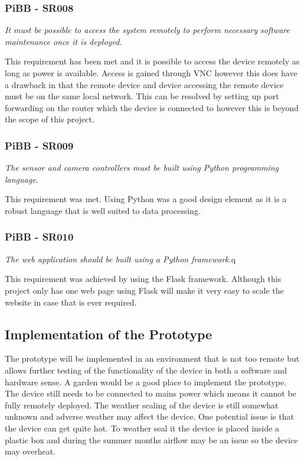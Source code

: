 \documentclass[10pt,a4paper]{article}
\begin{document}
\subsubsection{PiBB - SR008}
\begin{center}
\textit{It must be possible to access the system remotely to perform necessary software maintenance once it is deployed. }
\linebreak
\end{center}
This requirement has been met and it is possible to access the device remotely as long as power is available. Access is gained through VNC however this does have a drawback in that the remote device and device accessing the remote device must be on the same local network. This can be resolved by setting up port forwarding on the router which the device is connected to however this is beyond the scope of this project. 

\subsubsection{PiBB - SR009}
\begin{center}
\textit{The sensor and camera controllers must be built using Python programming language.}
\linebreak
\end{center} 
This requirement was met. Using Python was a good design element as it is a robust language that is well suited to data processing. 

\subsubsection{PiBB - SR010}
\begin{center}
\textit{The web application should be built using a Python framework.}q
\linebreak
\end{center}
This requirement was achieved by using the Flask framework. Although this project only has one web page using Flask will make it very easy to scale the website in case that is ever required. 

\subsection{Implementation of the Prototype}
The prototype will be implemented in an environment that is not too remote but allows further testing of the functionality of the device in both a software and hardware sense. A garden would be a good place to implement the prototype. The device still needs to be connected to mains power which means it cannot be fully remotely deployed. The weather sealing of the device is still somewhat unknown and adverse weather may affect the device. One potential issue is that the device can get quite hot. To weather seal it the device is placed inside a plastic box and during the summer months airflow may be an issue so the device may overheat. 
\end{document}
